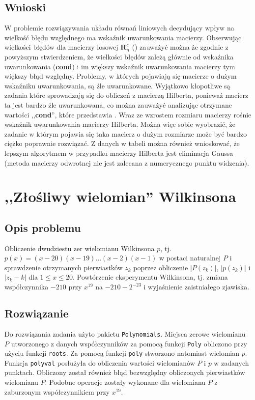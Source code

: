 \documentclass[11pt]{mk-polish-lab-report}
\begin{document}
\subsection{Wnioski}

W problemie rozwiązywania układu równań liniowych decydujący wpływ na wielkość błędu względnego ma wskaźnik uwarunkowania macierzy. Obserwując wielkości błędów dla macierzy losowej $\mathbf{R}_n^c$ () zauważyć można że zgodnie z powyższym stwierdzeniem, że wielkości błędów zależą głównie od wskaźnika uwarunkowania (\textbf{cond}) i im większy wskaźnik uwarunkowania macierzy tym większy błąd względny. Problemy, w których pojawiają się macierze o dużym wskaźniku uwarunkowania, są źle uwarunkowane. Wyjątkowo kłopotliwe są zadania które sprowadzają się do obliczeń z macierzą Hilberta, ponieważ macierz ta jest bardzo źle uwarunkowana, co można zauważyć analizując otrzymane wartości ,,\textbf{cond}'', które przedstawia . Wraz ze wzrostem rozmiaru macierzy rośnie wskaźnik uwarunkowania macierzy Hilberta. Można więc sobie wyobrazić, że zadanie w którym pojawia się taka macierz o dużym rozmiarze może być bardzo ciężko poprawnie rozwiązać. Z danych w tabeli można również wnioskować, że lepszym algorytmem w przypadku macierzy Hilberta jest eliminacja Gaussa (metoda macierzy odwrotnej nie jest zalecana z numerycznego punktu widzenia).

\section{,,Złośliwy wielomian'' Wilkinsona}

\subsection{Opis problemu}

Obliczenie dwudziestu zer wielomianu Wilkinsona $p$, tj. $p(x) = (x-20)(x-19)\dots(x-2)(x-1)$ w postaci naturalnej $P$ i sprawdzenie otrzymanych pierwiastków $z_k$ poprzez obliczenie $|P(z_k)|$, $|p(z_k)|$ i $|z_k-k|$ dla $1\leq x\leq 20$. Powtórzenie eksperymentu Wilkinsona, tj. zmiana współczynnika $-210$ przy $x^{19}$ na $-210-2^{-23}$ i wyjaśnienie zaistniałego zjawiska.

\subsection{Rozwiązanie}

Do rozwiązania zadania użyto pakietu \texttt{Polynomials}. Miejsca zerowe wielomianu $P$ utworzonego z danych współczynników za pomocą funkcji \texttt{Poly} obliczono przy użyciu funkcji \texttt{roots}. Za pomocą funkcji \texttt{poly} stworzono natomiast wielomian $p$. Funkcja \texttt{polyval} posłużyła do obliczenia wartości wielomianów $P$ i $p$ w zadanych punktach. Obliczony został również błąd bezwzględny obliczonych pierwiastków wielomianu $P$. Podobne operacje zostały wykonane dla wielomianu $P$ z zaburzonym współczynnikiem przy $x^{19}$.
\end{document}
